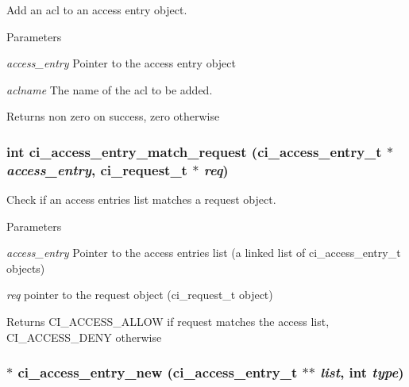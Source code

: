 Add an acl to an access entry object. 
\begin{DoxyParams}{Parameters}
\item[{\em access\_\-entry}]Pointer to the access entry object \item[{\em aclname}]The name of the acl to be added. \end{DoxyParams}
\begin{DoxyReturn}{Returns}
non zero on success, zero otherwise 
\end{DoxyReturn}
\hypertarget{group__ACL_ga8e5833ad80ae63dc66bff07f398f0d89}{
\subsubsection[{ci\_\-access\_\-entry\_\-match\_\-request}]{\setlength{\rightskip}{0pt plus 5cm}int ci\_\-access\_\-entry\_\-match\_\-request ({\bf ci\_\-access\_\-entry\_\-t} $\ast$ {\em access\_\-entry}, \/  {\bf ci\_\-request\_\-t} $\ast$ {\em req})}}
\label{group__ACL_ga8e5833ad80ae63dc66bff07f398f0d89}


Check if an access entries list matches a request object. 
\begin{DoxyParams}{Parameters}
\item[{\em access\_\-entry}]Pointer to the access entries list (a linked list of ci\_\-access\_\-entry\_\-t objects) \item[{\em req}]pointer to the request object (ci\_\-request\_\-t object) \end{DoxyParams}
\begin{DoxyReturn}{Returns}
CI\_\-ACCESS\_\-ALLOW if request matches the access list, CI\_\-ACCESS\_\-DENY otherwise 
\end{DoxyReturn}
\hypertarget{group__ACL_ga8b59d23a19247a61b2df28fc59105857}{
\subsubsection[{ci\_\-access\_\-entry\_\-new}]{$\ast$ ci\_\-access\_\-entry\_\-new ({\bf ci\_\-access\_\-entry\_\-t} $\ast$$\ast$ {\em list}, \/  int {\em type})}}
\label{group__ACL_ga8b59d23a19247a61b2df28fc59105857}


